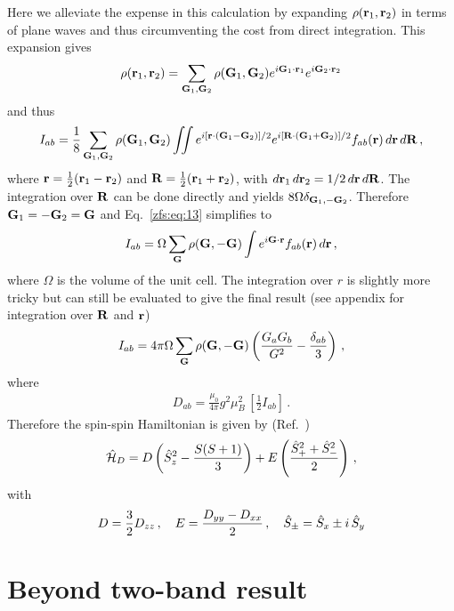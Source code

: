 Here we alleviate the expense in this calculation by expanding $\rho(\mathbf{r}_1,\mathbf{r}_2)$ in terms of plane waves and thus circumventing the cost from direct integration. This expansion gives
\begin{align}
    \rho(\mathbf{r}_1,\mathbf{r}_2) = \sum_{\mathbf{G}_1,\mathbf{G}_2} \rho(\mathbf{G}_1,\mathbf{G}_2) e^{i\mathbf{G}_1\cdot\mathbf{r}_1} e^{i\mathbf{G}_2\cdot\mathbf{r}_2}
    \label{zfs:eq:12}
\end{align}
and thus
\begin{align}
    I_{ab} = \frac{1}{8} \sum_{\mathbf{G}_1,\mathbf{G}_2} \rho(\mathbf{G}_1,\mathbf{G}_2)\iint
    e^{i[\mathbf{r}\cdot(\mathbf{G}_1-\mathbf{G}_2)]/2} e^{i[\mathbf{R}\cdot(\mathbf{G}_1+\mathbf{G}_2)]/2} f_{ab}(\mathbf{r})\, d\mathbf{r}\, d\mathbf{R} \, ,
    \label{zfs:eq:13}
\end{align}
where $\mathbf{r}=\frac{1}{2}(\mathbf{r}_1-\mathbf{r}_2)$ and $\mathbf{R}=\frac{1}{2}(\mathbf{r}_1+\mathbf{r}_2)$, with $d\mathbf{r}_1\,d\mathbf{r}_2=1/2\,d\mathbf{r}\, d\mathbf{R}$. The integration over $\mathbf{R}$ can be done directly and yields $8\Omega\delta_{\mathbf{G}_1,-\mathbf{G}_2}$. Therefore $\mathbf{G}_1=-\mathbf{G}_2=\mathbf{G}$ and Eq.~\ref{zfs:eq:13} simplifies to
\begin{align}
    I_{ab} = \Omega \sum_{\mathbf{G}} \rho(\mathbf{G},-\mathbf{G})\int
    e^{i\mathbf{G}\cdot\mathbf{r}} f_{ab}(\mathbf{r})\, d\mathbf{r}\, ,
    \label{zfs:eq:14}
\end{align}
where $\Omega$ is the volume of the unit cell. The integration over $r$ is slightly more tricky but can still be evaluated to give the final result (see appendix for integration over $\mathbf{R}$ and $\mathbf{r}$)
\begin{align}
    I_{ab} = 4\pi\Omega \sum_{\mathbf{G}} \rho(\mathbf{G},-\mathbf{G}) \left( \frac{G_aG_b}{G^2} - \frac{\delta_{ab}}{3} \right)\, ,
    \label{zfs:eq:15}
\end{align}
where
\begin{align}
D_{ab}= \frac{\mu_0}{4\pi}g^2\mu_{B}^2\, \left[\frac{1}{2}I_{ab}\right] \, .
    \label{zfs:eq:16}
\end{align}
Therefore the spin-spin Hamiltonian is given by (Ref.~\cite{ivady2014pressure})
\begin{align}
    \mathcal{\hat{H}}_D = D \left(\hat{S}_{z}^2-\frac{S(S+1)}{3} \right) + E \left(\frac{\hat{S}_{+}^2+\hat{S}_{-}^2}{2}\right) \, ,
    \label{zfs:eq:17}
\end{align}
with
\begin{align}
    D=\frac{3}{2}D_{zz} \, , \quad
    E=\frac{D_{yy}-D_{xx}}{2}  \, , \quad
    \hat{S}_{\pm} = \hat{S}_{x} \pm i \, \hat{S}_{y}
    \label{zfs:eq:18}
\end{align}


\section{Beyond two-band result}

